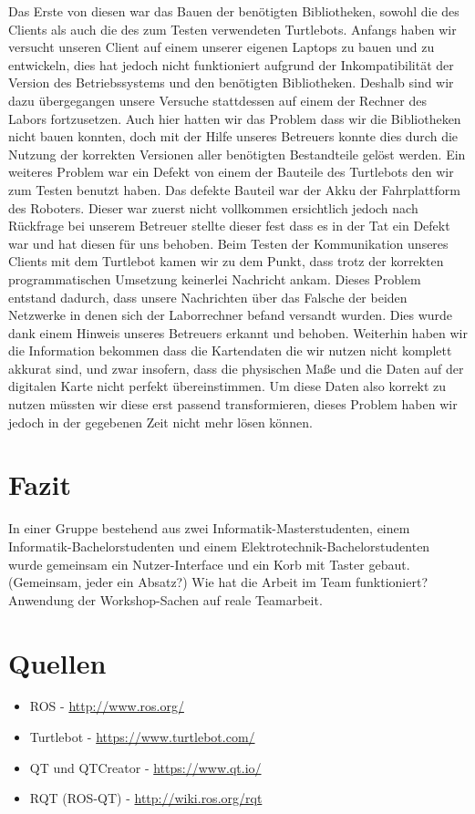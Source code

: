 \documentclass[a4paper,12pt,headsepline]{scrartcl}
\begin{document}
Das Erste von diesen war das Bauen der benötigten Bibliotheken, sowohl die des Clients als auch die des zum Testen verwendeten Turtlebots. Anfangs haben wir versucht unseren Client auf einem unserer eigenen Laptops zu bauen und zu entwickeln, dies hat jedoch nicht funktioniert aufgrund der Inkompatibilität der Version des Betriebssystems und den benötigten Bibliotheken. Deshalb sind wir dazu übergegangen unsere Versuche stattdessen auf einem der Rechner des Labors fortzusetzen. Auch hier hatten wir das Problem dass wir die Bibliotheken nicht bauen konnten, doch mit der Hilfe unseres Betreuers konnte dies durch die Nutzung der korrekten Versionen aller benötigten Bestandteile gelöst werden. Ein weiteres Problem war ein Defekt von einem der Bauteile des Turtlebots den wir zum Testen benutzt haben. Das defekte Bauteil war der Akku der Fahrplattform des Roboters. Dieser war zuerst nicht vollkommen ersichtlich jedoch nach Rückfrage bei unserem Betreuer stellte dieser fest dass es in der Tat ein Defekt war und hat diesen für uns behoben. Beim Testen der Kommunikation unseres Clients mit dem Turtlebot kamen wir zu dem Punkt, dass trotz der korrekten programmatischen Umsetzung keinerlei Nachricht ankam. Dieses Problem entstand dadurch, dass unsere Nachrichten über das Falsche der beiden Netzwerke in denen sich der Laborrechner befand versandt wurden. Dies wurde dank einem Hinweis unseres Betreuers erkannt und behoben.
Weiterhin haben wir die Information bekommen dass die Kartendaten die wir nutzen nicht komplett akkurat sind, und zwar insofern, dass die physischen Maße und die Daten auf der digitalen Karte nicht perfekt übereinstimmen. Um diese Daten also korrekt zu nutzen müssten wir diese erst passend transformieren, dieses Problem haben wir jedoch in der gegebenen Zeit nicht mehr lösen können.
	\section{Fazit}
		In einer Gruppe bestehend aus zwei Informatik-Masterstudenten, einem Informatik-Bachelorstudenten und einem Elektrotechnik-Bachelorstudenten wurde gemeinsam ein Nutzer-Interface und ein Korb mit Taster gebaut.\\
		(Gemeinsam, jeder ein Absatz?)
		Wie hat die Arbeit im Team funktioniert? Anwendung der Workshop-Sachen auf reale Teamarbeit.
		
	\newpage
	\section{Quellen}
		\begin{itemize}
			\item ROS - \href{http://www.ros.org/}{http://www.ros.org/}
			\item Turtlebot - \href{https://www.turtlebot.com/}{https://www.turtlebot.com/}
			\item QT und QTCreator - \href{https://www.qt.io/}{https://www.qt.io/}
			\item RQT (ROS-QT) - \href{http://wiki.ros.org/rqt}{http://wiki.ros.org/rqt}
		\end{itemize}
\end{document}
